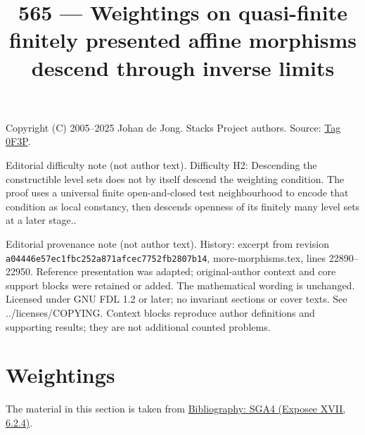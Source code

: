 \documentclass{amsart}
\theoremstyle{plain}
\theoremstyle{definition}
\theoremstyle{remark}
\numberwithin{equation}{subsection}
\begin{document}
\title[Stacks Project, Tag 0F3P]{565 --- Weightings on quasi-finite finitely presented affine morphisms descend through inverse limits}
\maketitle
\noindent Copyright (C) 2005--2025 Johan de Jong. Stacks Project authors. Source: \href{https://stacks.math.columbia.edu/tag/0F3P}{Tag 0F3P}.

\noindent Editorial difficulty note (not author text). Difficulty H2: Descending the constructible level sets does not by itself descend the weighting condition. The proof uses a universal finite open-and-closed test neighbourhood to encode that condition as local constancy, then descends openness of its finitely many level sets at a later stage..

\noindent Editorial provenance note (not author text). History: excerpt from revision \texttt{a0444\allowbreak 6e57e\allowbreak c1fbc\allowbreak 252a8\allowbreak 71afc\allowbreak ec775\allowbreak 2fb28\allowbreak 07b14}, more-morphisms.tex, lines 22890--22950. Reference presentation was adapted; original-author context and core support blocks were retained or added. The mathematical wording is unchanged. Licensed under GNU FDL 1.2 or later; no invariant sections or cover texts. See ../licenses/COPYING. Context blocks reproduce author definitions and supporting results; they are not additional counted problems.

\section{Weightings}
\label{section-weightings}

\noindent
The material in this section is taken from \href{https://stacks.math.columbia.edu/bibliography}{Bibliography: SGA4 (Exposee XVII, 6.2.4)}.
\end{document}

